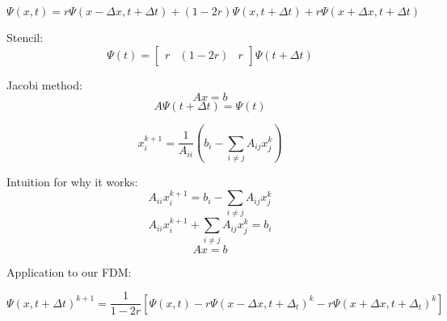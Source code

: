\documentclass[12pt]{article}
\begin{document}
\[ 
    \Psi(x, t)
    = r\Psi(x - \Delta x, t + \Delta t) + (1 - 2r)\Psi(x, t + \Delta t) + r\Psi(x + \Delta x, t + \Delta t)
\]

Stencil:
\[ \Psi(t) = \begin{bmatrix} r & (1 - 2r) & r \end{bmatrix} \Psi(t + \Delta t) \]


Jacobi method:
\[ Ax = b \]
\[ A \Psi(t + \Delta t) = \Psi(t) \]

\[ x^{k + 1}_i = \frac{1}{A_{ii}} \left( b_i - \sum_{i \ne j} A_{ij} x_j^k \right) \]

Intuition for why it works:
\[ A_{ii} x^{k + 1}_i = b_i - \sum_{i \ne j} A_{ij} x_j^k \]
\[ A_{ii} x^{k + 1}_i + \sum_{i \ne j} A_{ij} x_j^k = b_i  \]
\[ Ax = b  \]

Application to our FDM:

\[ \Psi(x, t + \Delta t)^{k + 1} 
    = \frac{1}{1 - 2r} 
    \left[ 
        \Psi(x, t) 
        - r\Psi(x - \Delta x, t + \Delta_t)^{k} 
        - r\Psi(x + \Delta x, t + \Delta_t)^{k} 
    \right]
\]
\end{document}
